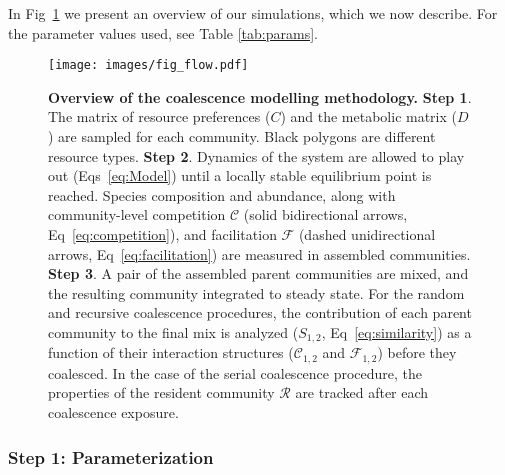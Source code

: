 \documentclass[10pt,letterpaper]{article}
\begin{document}
In Fig~\ref{fig:work_flow} we present an overview of our simulations, which we now describe. For the parameter values used, see Table \ref{tab:params}. 

\begin{figure}[t]
\begin{adjustwidth}{-2.2in}{0in}
    \centering
    \texttt{[image: images/fig\_flow.pdf]}
    \vspace{15pt}
    \caption{\textbf{Overview of the coalescence modelling methodology.} \textbf{Step 1}. The matrix of resource preferences ($C$) and the metabolic matrix ($D$) are sampled for each community. Black polygons are different resource types. \textbf{Step 2}. Dynamics of the system are allowed to play out (Eqs~\ref{eq:Model}) until a locally stable equilibrium point is reached. Species composition and abundance, along with community-level competition $\mathcal{C}$ (solid bidirectional arrows, Eq~\ref{eq:competition}), and facilitation $\mathcal{F}$ (dashed unidirectional arrows, Eq~\ref{eq:facilitation}) are measured in assembled communities. \textbf{Step 3}. A pair of the assembled parent communities are mixed, and the resulting community integrated to steady state. For the random and recursive coalescence procedures, the contribution of each parent community to the final mix is analyzed ($S_{1, 2}$, Eq~\ref{eq:similarity}) as a function of their interaction structures ($\mathcal{C}_{1, 2}$ and $\mathcal{F}_{1, 2}$) before they coalesced. In the case of the serial coalescence procedure, the properties of the resident community $\mathcal{R}$ are tracked after each coalescence exposure.}
    \label{fig:work_flow}
\end{adjustwidth}
\end{figure}

\subsubsection*{Step 1: Parameterization}\label{Step1}\vspace{-5pt}
\end{document}
